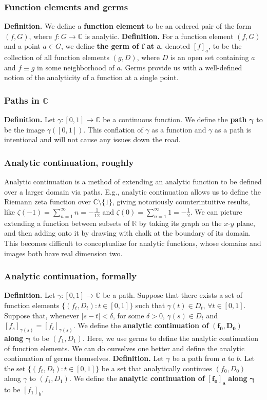 \documentclass{beamer}
\newcommand{\ra}{\rightarrow}
\newcommand{\rs}{\mathbb{R}}
\newcommand{\cs}{\mathbb{C}}
\begin{document}
	\begin{frame}
		\frametitle{Function elements and germs}
		\textbf{Definition.} We define a \textbf{function element} to be an ordered pair of the form $(f, G)$, where $f : G \ra \cs$ is analytic. 
		\vskip0.2in
		\textbf{Definition.} For a function element $(f, G)$ and a point $a \in G$, we define \textbf{the germ of $\boldsymbol f$ at $\boldsymbol a$}, denoted $[f]_a$, to be the collection of all function elements $(g, D)$, where $D$ is an open set containing $a$ and $f \equiv g$ in some neighborhood of $a$.
		\vskip0.2in
		Germs provide us with a well-defined notion of the analyticity of a function at a single point.
	\end{frame}

	\begin{frame}
		\frametitle{Paths in $\cs$}
		\textbf{Definition.} Let $\gamma:[0, 1]\ra\cs$ be a continuous function. We define the \textbf{path} $\boldsymbol{\gamma}$ to be the image $\gamma([0, 1])$.
		\vskip0.2in
		This conflation of $\gamma$ as a function and $\gamma$ as a path is intentional and will not cause any issues down the road.
	\end{frame}

	\begin{frame}
		\frametitle{Analytic continuation, roughly}
		Analytic continuation is a method of extending an analytic function to be defined over a larger domain via paths.
		\vskip0.2in
		E.g., analytic continuation allows us to define the Riemann zeta function over $\cs \setminus \{1\}$, giving notoriously counterintuitive results, like $\zeta(-1) = \sum_{n=1}^\infty n = -\frac 1 {12}$ and $\zeta(0) = \sum_{n=1}^\infty 1 = -\frac 1 2$.
		\vskip0.2in
		We can picture extending a function between subsets of $\rs$ by taking its graph on the $x$-$y$ plane, and then adding onto it by drawing with chalk at the boundary of its domain. This becomes difficult to conceptualize for analytic functions, whose domains and images both have real dimension two.
	\end{frame}

	\begin{frame}
		\frametitle{Analytic continuation, formally}
		\textbf{Definition.} Let $\gamma:[0, 1]\ra\cs$ be a path. Suppose that there exists a set of function elements $\{(f_t, D_t) : t\in[0, 1]\}$ such that $\gamma(t)\in D_t$, $\forall t\in [0, 1]$. Suppose that, whenever $|s-t|<\delta$, for some $\delta > 0$, $\gamma(s)\in D_t$ and $[f_s]_{\gamma(s)} = [f_t]_{\gamma(s)}$. We define the \textbf{analytic continuation of} $\boldsymbol{(f_0, D_0)}$ \textbf{along} $\boldsymbol\gamma$ to be $(f_1, D_1)$.
		\vskip0.2in
		Here, we use germs to define the analytic continuation of function elements. We can do ourselves one better and define the analytic continuation of germs themselves.
		\vskip0.2in
		\textbf{Definition.} Let $\gamma$ be a path from $a$ to $b$. Let the set $\{(f_t, D_t) : t\in[0, 1]\}$ be a set that analytically continues $(f_0, D_0)$ along $\gamma$ to $(f_1, D_1)$. We define the \textbf{analytic continuation of} $\boldsymbol{[f_0]_a}$ \textbf{along} $\boldsymbol\gamma$ to be $[f_1]_b$.
	\end{frame}
\end{document}
